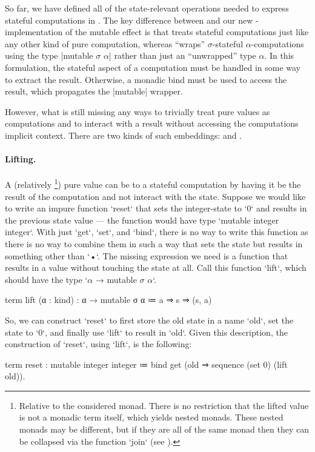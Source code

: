 \newparagraph

So far, we have defined all of the state-relevant operations needed to express stateful computations in \LangA.
The key difference between \LangB and our new \LangA-implementation of the mutable effect is that \LangB treats stateful computations just like any other kind of pure computation, whereas \LangA ``wraps'' $σ$-stateful $α$-computations using the type \code|mutable $σ$ $α$| rather than just an ``unwrapped'' type $α$.
In this formulation, the stateful aspect of a computation must be handled in some way to extract the result.
Otherwise, a monadic bind must be used to access the result, which propagates the \code|mutable| wrapper.

However, what is still missing any ways to trivially treat pure values as computations and to interact with a result without accessing the computations implicit context.
There are two kinds of such embeddings:  and .

\paragraph{Lifting.}
A (relatively%
\footnote{
  Relative to the considered monad.
  There is no restriction that the lifted value is not a monadic term itself, which yields nested monads.
  These nested monads may be different, but if they are all of the same monad then they can be collapsed via the function \code`join` (see \prelude{\LangC}).
}) pure value
can be  to a stateful computation by having it be the result of the computation and not interact with the state.
Suppose we would like to write an impure function \code`reset` that sets the integer-state to \code`0` and results in the previous state value --- the function would have type \code`mutable integer integer`.
With just \code`get`, \code`set`, and \code`bind`, there is no way to write this function as there is no way to combine them in such a way that sets the state but results in something other than \code`•`.
The missing expression we need is a function that results in a value without touching the state at all.
Call this function \code`lift`,
which should have the type \code`$α$ → mutable $σ$ $α$`.
%
\begin{program}
term lift (α : kind) : α → mutable σ α
  ≔ a ⇒
      s ⇒ (s, a)
\end{program}
%
So, we can construct \code`reset` to first store the old state in a name \code`old`, set the state to \code`0`, and finally use \code`lift` to result in \code`old`.
Given this description, the construction of \code`reset`, using \code`lift`, is the following:
%
\begin{snippet}
term reset : mutable integer integer
  ≔ bind get
      (old ⇒ sequence
        (set 0)
        (lift old)).
\end{snippet}

